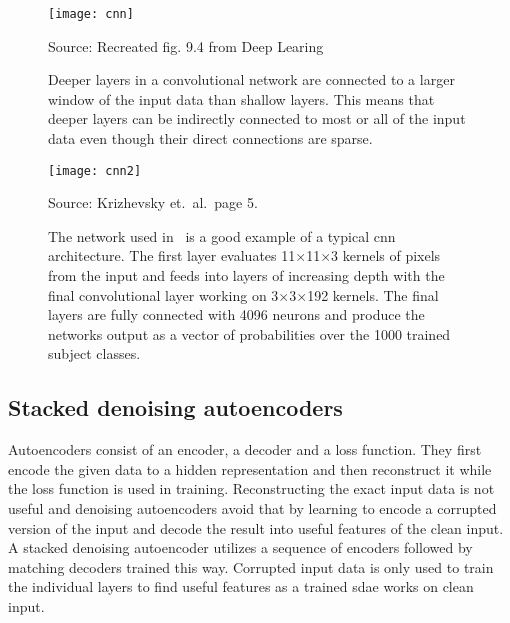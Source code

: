 \begin{figure}[H]
\centering
\texttt{[image: cnn]}
\caption*{Source: Recreated fig. 9.4 from Deep Learing~\cite{DEEP_LEARNING}}
\caption{Deeper layers in a convolutional network are connected to a larger window of the
         input data than shallow layers. This means that deeper layers can be indirectly
         connected to most or all of the input data even though their direct connections
         are sparse.~\cite{DEEP_LEARNING}}\label{fig:scon}
\end{figure}

\begin{figure}[H]
\centering
\texttt{[image: cnn2]}
\caption*{Source: Krizhevsky et.~al.~page 5.~\cite{NIPS_IMAGENET}}
\caption{The network used in~\cite{NIPS_IMAGENET} is a good example of a typical \ac{cnn}
         architecture. The first layer evaluates 11$\times$11$\times$3 kernels of pixels
         from the input and feeds into layers of increasing depth with the final
         convolutional layer working on 3$\times$3$\times$192 kernels. The final layers
         are fully connected with 4096 neurons and produce the networks output as a vector
         of probabilities over the 1000 trained subject classes.}\label{fig:cnn}
\end{figure}

\subsection{Stacked denoising autoencoders}
Autoencoders consist of an encoder, a decoder and a loss function. They first encode the
given data to a hidden representation and then reconstruct it while the loss function is
used in training. Reconstructing the exact input data is not useful and denoising
autoencoders avoid that by learning to encode a corrupted version of the input and
decode the result into useful features of the clean input. A stacked denoising autoencoder
utilizes a sequence of encoders followed by matching decoders trained this way.
Corrupted input data is only used to train the individual layers to find useful features
as a trained \ac{sdae} works on clean input.~\cite{SDAE}
